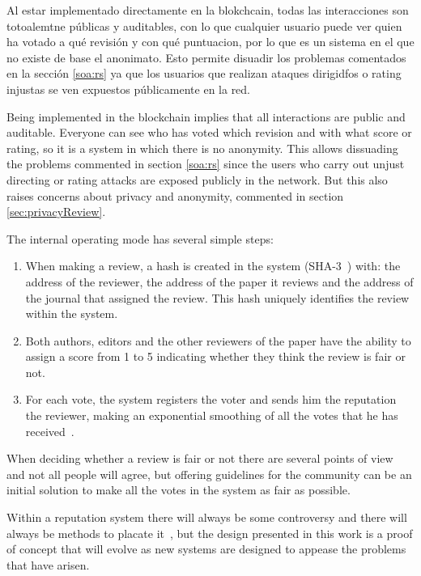 Al estar implementado directamente en la blokchcain, todas las interacciones son
totoalemtne públicas y auditables, con lo que cualquier usuario puede ver quien
ha votado a qué revisión y con qué puntuacion, por lo que es un sistema en el
que no existe de base el anonimato. Esto permite disuadir los problemas
comentados en la sección \ref{soa:rs} ya que los usuarios que realizan ataques
dirigidfos o rating injustas se ven expuestos públicamente en la red.


Being implemented in the blockchain implies that all interactions are public and
auditable. Everyone can see who has voted which revision and with what score or
rating, so it is a system in which there is no anonymity. This allows dissuading
the problems commented in section \ref{soa:rs} since the users who carry out
unjust directing or rating attacks are exposed publicly in the network. But this
also raises concerns about privacy and anonymity, commented in section
\ref{sec:privacyReview}.

The internal operating mode has several simple steps:
\begin{enumerate}
\item When making a review, a hash is created in the system
  (SHA-3~\cite{aumasson2008sha}) with: the address of the reviewer, the address
  of the paper it reviews and the address of the journal that assigned the
  review. This hash uniquely identifies the review within the system.
  
\item Both authors, editors and the other reviewers of the paper have the
  ability to assign a score from 1 to 5 indicating whether they think the review
  is fair or not.
  
\item For each vote, the system registers the voter and sends him the reputation
     the reviewer, making an exponential smoothing of all the votes that he has
     received~\cite{gardner1985exponential}.
\end{enumerate}

When deciding whether a review is fair or not there are several points of
view~\cite{daniel1993guardians,cole1979fair} and not all people will agree, but
offering guidelines for the community can be an initial solution to make all the
votes in the system as fair as possible.

Within a reputation system there will always be some controversy and there will
always be methods to placate it~\cite{dellarocas2000immunizing}, but the design presented in this work is a
proof of concept that will evolve as new systems are designed to appease the
problems that have arisen.


